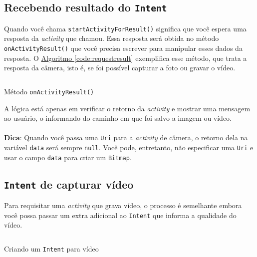 \documentclass[a4paper,12pt,brazil,oneside]{book}
\begin{document}
\begin{singlespace}
	\subsection{Recebendo resultado do \texttt{Intent}}
		
		Quando você chama \texttt{startActivityForResult()} significa que você espera uma resposta da \emph{activity} que chamou. Essa resposta será obtida no método \texttt{onActivityResult()} que você precisa escrever para manipular esses dados da resposta. O \hyperref[code:requestresult]{Algoritmo \ref*{code:requestresult}} exemplifica esse método, que trata a resposta da câmera, isto é, se foi possível capturar a foto ou gravar o vídeo.

		\begin{listing}[H]
		\inputminted[linenos=true,fontsize=\small,frame=lines, framesep=2mm, tabsize=2,numbersep=5pt]{java}{src/api/camera/requestresult.java}
		\caption{Método \texttt{onActivityResult()}}
		\label{code:requestresult}
		\end{listing} 		

		A lógica está apenas em verificar o retorno da \emph{activity} e mostrar uma mensagem ao usuário, o informando do caminho em que foi salvo a imagem ou vídeo.  

		\begin{framed}
\paragraph{}\textbf{Dica}: Quando você passa uma \texttt{Uri} para a \emph{activity} de câmera, o retorno dela na variável \texttt{data} será sempre \texttt{null}. Você pode, entretanto, não especificar uma \texttt{Uri} e usar o campo \texttt{data} para criar um \texttt{Bitmap}.
\textit{ }
\end{framed}

	\subsection{\texttt{Intent} de capturar vídeo}

		Para requisitar uma \emph{activity} que grava vídeo, o processo é semelhante embora você possa passar um extra adicional ao \texttt{Intent} que informa a qualidade do vídeo.

		\begin{listing}[H]
		\inputminted[linenos=true,fontsize=\small,frame=lines, framesep=2mm, tabsize=2,numbersep=5pt]{java}{src/api/camera/recordintent.java}
		\caption{Criando um \texttt{Intent} para vídeo}
		\label{code:recordintent}
		\end{listing} 		
		

\end{singlespace}
\end{document}
